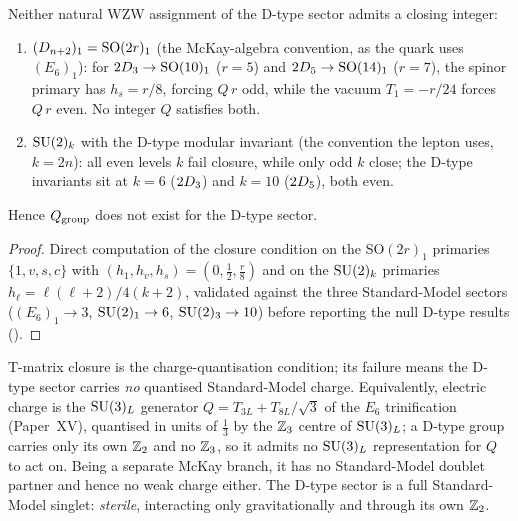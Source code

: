 \begin{proposition}
\label{P21:prop:noclosure}
Neither natural WZW assignment of the D-type sector admits a closing
integer:
\begin{enumerate}[noitemsep,label=(\alph*)]
\item $(D_{n+2})_1=\mathrm{SO}(2r)_1$ (the McKay-algebra convention, as the quark
uses $(E_6)_1$): for $2D_3\to\mathrm{SO}(10)_1$ ($r=5$) and
$2D_5\to\mathrm{SO}(14)_1$ ($r=7$), the spinor primary has $h_s=r/8$, forcing
$Q\,r$ odd, while the vacuum $T_1=-r/24$ forces $Q\,r$ even. No integer
$Q$ satisfies both.
\item $\mathrm{SU}(2)_k$ with the D-type modular invariant (the convention the
lepton uses, $k=2n$): all even levels $k$ fail closure, while only odd
$k$ close; the D-type invariants sit at $k=6$ ($2D_3$) and $k=10$
($2D_5$), both even.
\end{enumerate}
Hence $Q_{\mathrm{group}}$ does not exist for the D-type sector.
\end{proposition}
\begin{proof}
Direct computation of the closure condition on the SO$(2r)_1$ primaries
$\{1,v,s,c\}$ with $(h_1,h_v,h_s)=(0,\tfrac12,\tfrac r8)$ and on the
$\mathrm{SU}(2)_k$ primaries $h_\ell=\ell(\ell+2)/4(k+2)$, validated against the
three Standard-Model sectors ($(E_6)_1\to3$, $\mathrm{SU}(2)_1\to6$,
$\mathrm{SU}(2)_3\to10$) before reporting the null D-type results
().
\end{proof}

\begin{corollary}[Sterility]
\label{P21:cor:sterile}
T-matrix closure is the charge-quantisation condition; its failure means
the D-type sector carries \emph{no} quantised Standard-Model charge.
Equivalently, electric charge is the $\mathrm{SU}(3)_L$ generator
$Q=T_{3L}+T_{8L}/\sqrt3$ of the $E_6$ trinification (Paper~XV),
quantised in units of $\tfrac13$ by the $\mathbb{Z}_3$ centre of $\mathrm{SU}(3)_L$;
a D-type group carries only its own $\mathbb{Z}_2$ and no $\mathbb{Z}_3$, so it
admits no $\mathrm{SU}(3)_L$ representation for $Q$ to act on. Being a separate
McKay branch, it has no Standard-Model doublet partner and hence no weak
charge either. The D-type sector is a full Standard-Model singlet:
\emph{sterile}, interacting only gravitationally and through its own
$\mathbb{Z}_2$.
\end{corollary}

